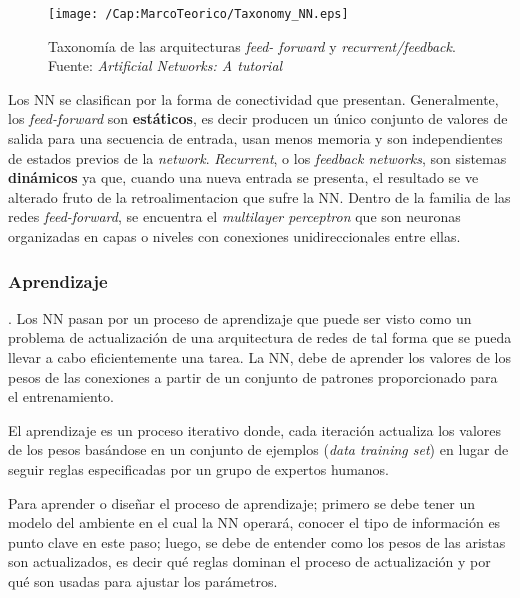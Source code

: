 \begin{figure}[h]
  \centering
  \texttt{[image: /Cap:MarcoTeorico/Taxonomy\_NN.eps]}
  \caption[Taxonomía de las arquitecturas \textit{feed-forward} y 
  \textit{recurrent/feedback}]{Taxonomía de las arquitecturas \textit{feed-
  forward} y \textit{recurrent/feedback}.\\ \centering\tiny{Fuente: 
  \textit{Artificial Networks: A tutorial}\citep{Jain:1996:ANN-AT}}}
  \label{Fig:cap-marcoteorico:TaxonomyNN}
\end{figure}

Los NN se clasifican por la forma de conectividad que presentan. Generalmente,
los \textit{feed-forward} son \textbf{estáticos}, es decir producen un único 
conjunto de valores de salida para una secuencia de entrada, usan menos
memoria y son independientes de estados previos de la \textit{network}. 
\textit{Recurrent}, o los \textit{feedback networks}, son sistemas 
\textbf{dinámicos} ya que, cuando una nueva entrada se presenta, el resultado
se ve alterado fruto de la retroalimentacion que sufre la NN. Dentro de la 
familia de las redes \textit{feed-forward}, se encuentra el \textit{multilayer
perceptron} que son neuronas organizadas en capas o niveles con conexiones 
unidireccionales entre ellas.

\subsubsection{Aprendizaje}.
Los NN pasan por un proceso de aprendizaje que puede ser visto como un
problema de actualización de una arquitectura de redes de tal forma que se 
pueda llevar a cabo eficientemente una tarea. La NN, debe de aprender los
valores de los pesos de las conexiones a partir de un conjunto de patrones 
proporcionado para el entrenamiento. 

El aprendizaje es un proceso iterativo donde, cada iteración actualiza los
valores de los pesos basándose en un conjunto de ejemplos (\textit{data 
training set}) en lugar de seguir reglas especificadas por un grupo de 
expertos humanos.

Para aprender o diseñar el proceso de aprendizaje; primero se debe tener un 
modelo del ambiente en el cual la NN operará, conocer el tipo de información
es punto clave en este paso; luego, se debe de entender como los pesos de las 
aristas son actualizados, es decir qué reglas dominan el proceso de 
actualización y por qué son usadas para ajustar los parámetros.


